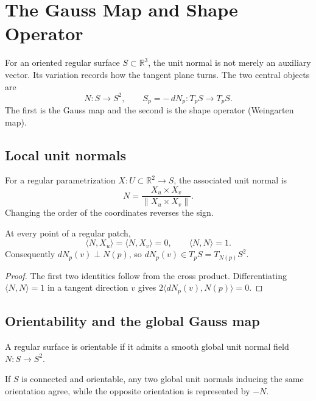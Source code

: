 \chapter{The Gauss Map and Shape Operator}
\label{ch:vii16-gauss-map-shape-operator}

For an oriented regular surface \(S\subset\mathbb R^3\), the unit normal is not merely an auxiliary vector.  Its variation records how the tangent plane turns.  The two central objects are
\[
\boxed{N:S\to S^2,\qquad S_p=-\,dN_p:T_pS\to T_pS.}
\]
The first is the Gauss map and the second is the shape operator (Weingarten map).

\section{Local unit normals}

\begin{definition}\label{def:vii16-local-normal}
For a regular parametrization \(X:U\subset\mathbb R^2\to S\), the associated unit normal is
\[
N=\frac{X_u\times X_v}{\|X_u\times X_v\|}.
\]
Changing the order of the coordinates reverses the sign.
\end{definition}

\begin{proposition}[Orthogonality]\label{prop:vii16-normal-orthogonal}
At every point of a regular patch,
\[
\langle N,X_u\rangle=\langle N,X_v\rangle=0,\qquad \langle N,N\rangle=1.
\]
Consequently \(dN_p(v)\perp N(p)\), so \(dN_p(v)\in T_pS=T_{N(p)}S^2\).
\end{proposition}

\begin{proof}
The first two identities follow from the cross product. Differentiating
\(\langle N,N\rangle=1\) in a tangent direction \(v\) gives
\(2\langle dN_p(v),N(p)\rangle=0\).
\end{proof}

\section{Orientability and the global Gauss map}

\begin{definition}\label{def:vii16-orientable}
A regular surface is orientable if it admits a smooth global unit normal field \(N:S\to S^2\).
\end{definition}

\begin{proposition}\label{prop:vii16-two-orientations}
If \(S\) is connected and orientable, any two global unit normals inducing the same orientation agree, while the opposite orientation is represented by \(-N\).
\end{proposition}

